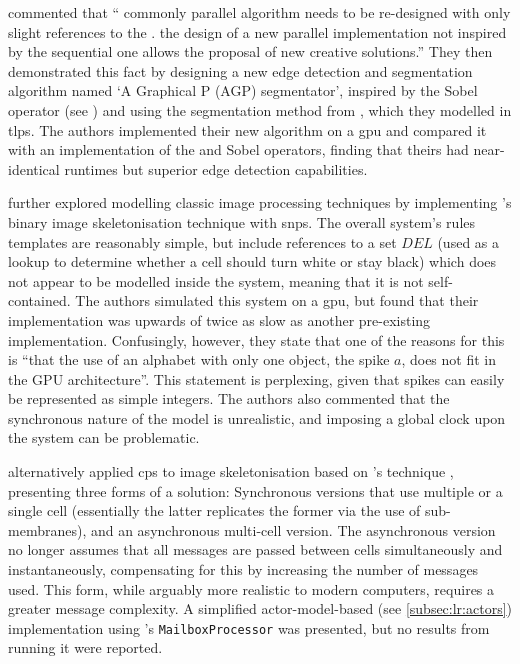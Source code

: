 \citeauthor{Diaz-Pernil2013} \cite{Diaz-Pernil2013} commented that \enquote{\textelp{} commonly  parallel algorithm needs to be re-designed with only slight references to the .  \textelp{} the design of a new parallel implementation not inspired by the sequential one allows \textelp{} the proposal of new creative solutions.}  They then demonstrated this fact by designing a new edge detection and segmentation algorithm named `A Graphical P (AGP) segmentator', inspired by the Sobel operator (see \eg{} \cite{Nixon2012}) and using the segmentation method from \cite{Christinal2011}, which they modelled in \gls{tlps}.  The authors implemented their new algorithm on a \gls{gpu} and compared it with an implementation of the  and  Sobel operators, finding that theirs had near-identical runtimes but superior edge detection capabilities.

\citeauthor{Diaz-Pernil2013a} \cite{Diaz-Pernil2013a} further explored modelling classic image processing techniques by implementing \citeauthor{Guo1989}'s binary image skeletonisation technique \cite{Guo1989} with \gls{snps}.  The overall system's rules templates are reasonably simple, but include references to a set \(\mathit{DEL}\) (used as a lookup to determine whether a cell should turn white or stay black) which does not appear to be modelled inside the system, meaning that it is not self-contained.  The authors simulated this system on a \gls{gpu}, but found that their implementation was upwards of twice as slow as another pre-existing implementation.  Confusingly, however, they state that one of the reasons for this is \enquote{that the use of an alphabet with only one object, the spike \(a\), does not fit in the GPU architecture}.  This statement is perplexing, given that spikes can easily be represented as simple integers.  The authors also commented that the synchronous nature of the model is unrealistic, and imposing a global clock upon the system can be problematic.

\citeauthor{Nicolescu2014} \cite{Nicolescu2014} alternatively applied \gls{cps} to image skeletonisation based on \citeauthor{Guo1989}'s technique \cite{Guo1989}, presenting three forms of a solution: Synchronous versions that use multiple or a single cell (essentially the latter replicates the former via the use of sub-membranes), and an asynchronous multi-cell version.  The asynchronous version no longer assumes that all messages are passed between cells simultaneously and instantaneously, compensating for this by increasing the number of messages used.  This form, while arguably more realistic to modern computers, requires a greater message complexity. A simplified \Gls{actor}-model-based (see \cref{subsec:lr:actors}) implementation using \fsharp{}'s \texttt{MailboxProcessor} \cite[ch.~11]{Syme2015a} was presented, but no results from running it were reported.

